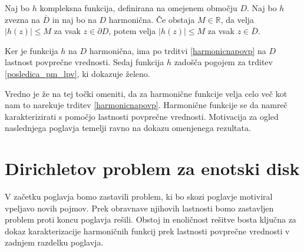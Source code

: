 \documentclass[mat1, tisk]{fmfdelo}
\begin{document}
    \begin{posledica}
        Naj bo $h$ kompleksna funkcija, definirana na omejenem območju $D$. Naj bo $h$ zvezna na $\overline{D}$ in naj bo na $D$ harmonična. 
        Če obstaja $M \in \mathbb{R}$, da velja $|h(z)| \leq M$ za vsak $z \in \partial D$, potem velja $|h(z)| \leq M$ za vsak $z \in \overline{D}$. 
    \end{posledica}
    \begin{dokaz}
        Ker je funkcija $h$ na $D$ harmonična, ima po trditvi \ref{harmonicnapovp} na $D$ lastnost povprečne vrednosti. Sedaj funkcija $h$ zadošča pogojem za trditev \ref{posledica_pm_lpv}, ki dokazuje želeno.
    \end{dokaz}

    Vredno je že na tej točki omeniti, da za harmonične funkcije velja celo več kot nam to narekuje trditev \ref{harmonicnapovp}. 
    Harmonične funkcije se da namreč karakterizirati s pomočjo lastnosti povprečne vrednosti. 
    Motivacija za ogled naslednjega poglavja temelji ravno na dokazu omenjenega rezultata. 

\section{Dirichletov problem za enotski disk}

V začetku poglavja bomo zastavili problem, ki bo skozi poglavje motiviral vpeljavo novih pojmov. 
Prek obravnave njihovih lastnosti bomo zastavljen problem proti koncu poglavja rešili. 
Obstoj in enoličnost rešitve bosta ključna za dokaz karakterizacije harmoničnih funkcij prek lastnosti povprečne vrednosti v zadnjem razdelku poglavja.
\end{document}
